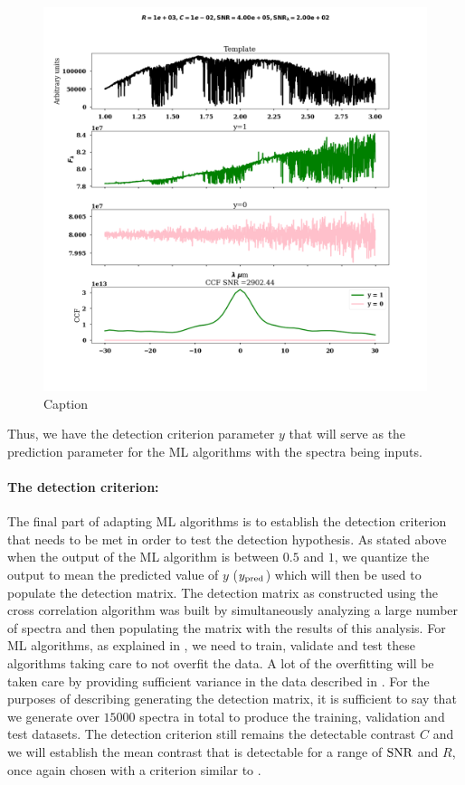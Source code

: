 \begin{figure}[!hb]
    \centering
    \includegraphics[width =\textwidth]{images/Chapter3/feature_compare_ccf_snr_2902.44.png}
    \caption{Caption}
    \label{fig:compare-specsnr=3000}
\end{figure}
Thus, we have the detection criterion parameter $y$ that will serve as the prediction parameter for the ML algorithms with the spectra being inputs.
\paragraph{The detection criterion:\\}
The final part of adapting ML algorithms is to establish the detection criterion that needs to be met in order to test the detection hypothesis.
As stated above when the output of the ML algorithm is between $0.5$ and $1$, we quantize the output to mean the predicted value of $y$ ($y_{\rm{pred}}$) which will then be used to populate the detection matrix.
The detection matrix as constructed using the cross correlation algorithm was built by simultaneously analyzing a large number of spectra and then populating the matrix with the results of this analysis.
For ML algorithms, as explained in , we need to train, validate and test these algorithms taking care to not overfit the data.
A lot of the overfitting will be taken care by providing sufficient variance in the data described in .
For the purposes of describing generating the detection matrix, it is sufficient to say that we generate over $15000$ spectra in total to produce the training, validation and test datasets.
The detection criterion still remains the detectable contrast $C$ and we will establish the mean contrast that is detectable for a range of $\rm{SNR}$ and $R$, once again chosen with a criterion similar to .

